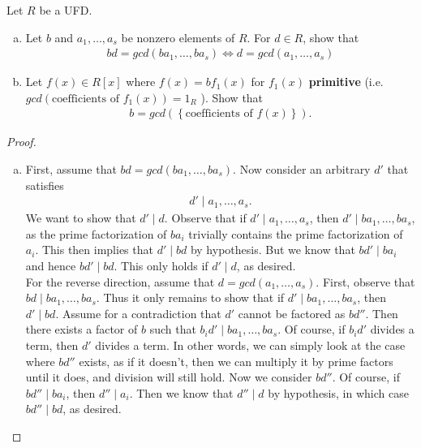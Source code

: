 \documentclass[num=1,duedate=02-03-21,course=Algebra\ II,proflastname=Walton]{hwtemplate}
\begin{document}
\problem[2]
\begin{claim}
	Let \(R\) be a UFD.
	\begin{enumerate}[(a).]
		\item Let \(b\) and \(a_1,\ldots,a_s\) be nonzero elements of \(R\). For \(d \in R\), show that
			\begin{align*}
				bd = gcd(ba_1,\ldots,ba_s) \iff d = gcd(a_1,\ldots,a_s)
			\end{align*}
		\item Let \(f(x) \in R[x]\) where \(f(x) = bf_1(x)\) for \(f_1(x)\) \textbf{primitive} (i.e. \(gcd(\text{coefficients of }f_1(x)) = 1_R\) ). Show that
			\begin{align*}
				b = gcd(\left\{ \text{coefficients of }f(x) \right\} ).
			\end{align*}
	\end{enumerate}

\end{claim}
\begin{proof}
	\begin{enumerate}[(a).]
		\item First, assume that \(bd = gcd(ba_1,\ldots,ba_s)\). Now consider an arbitrary \(d'\) that satisfies
			\begin{align*}
				d' \mid a_1,\ldots,a_s.
			\end{align*}
			We want to show that \(d' \mid d\). Observe that if \(d'\mid a_1,\ldots,a_s\), then \(d' \mid ba_1,\ldots,ba_s\), as the prime factorization of \(ba_i\) trivially contains the prime factorization of \(a_i\). This then implies that \(d' \mid bd\) by hypothesis. But we know that \(bd' \mid ba_i\) and hence \(bd' \mid bd\). This only holds if \(d'\mid d\), as desired.\\

			For the reverse direction, assume that \(d = gcd(a_1,\ldots,a_s)\). First, observe that \(bd \mid ba_1,\ldots,ba_s\). Thus it only remains to show that if \(d'\mid ba_1,\ldots,ba_s\), then \(d'\mid bd\). Assume for a contradiction that \(d'\) cannot be factored as \(bd''\). Then there exists a factor of \(b\) such that \(b_id' \mid ba_1,\ldots,ba_s\). Of course, if \(b_id'\) divides a term, then \(d'\) divides a term. In other words, we can simply look at the case where \(bd''\) exists, as if it doesn't, then we can multiply it by prime factors until it does, and division will still hold. Now we consider \(bd''\). Of course, if \(bd''\mid ba_i\), then \(d''\mid a_i\). Then we know that \(d''\mid d\) by hypothesis, in which case \(bd''\mid bd\), as desired.
\end{enumerate}
\end{proof}
\end{document}
